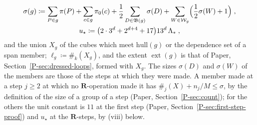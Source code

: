 \documentclass[11pt]{preprint}
\numberwithin{equation}{section}
\theoremstyle{definition}
\theoremstyle{remark}
\theoremstyle{plain}
\begin{document}
\begin{equation}\label{eq:r-group-size}
\begin{gathered}
    \sigma(g) \coloneqq \sum_{P \in g}\pi(P) + \sum_{c \in g}\pi_0(c) + \frac12\sum_{D \in \mathfrak B(g)}\sigma(D) + \sum_{W \in \mathcal W_g}\Bigl(\frac12\sigma(W) + 1\Bigr)\;,\\
    u_\star \coloneqq \bigl(2 \cdot 3^d + 2^{d+4} + 17\bigr)13^d\,\Lambda_*\;,
\end{gathered}
\end{equation}
and the union $X_g$ of the cubes which meet $\mathrm{hull}(g)$ or the dependence set of a span member; $\ell_g \coloneqq \#_k(X_g)$, and the extent $\operatorname{ext}(g)$ is that of Paper, Section~\ref{P-sec:dressed-loops}, formed with $X_g$. The sizes $\sigma(D)$ and $\sigma(W)$ of the members are those of the steps at which they were made. A member made at a step $j \geq 2$ at which no $\mathbf R$-operation made it has $\#_j(X) + n_j/M \leq \sigma$, by the definition of the size of a group of a step (Paper, Section~\ref{P-sec:count}); for the others the unit constant is $11$ at the first step (Paper, Section~\ref{P-sec:first-step-proof}) and $u_\star$ at the $\mathbf R$-steps, by (viii) below.
\end{document}
